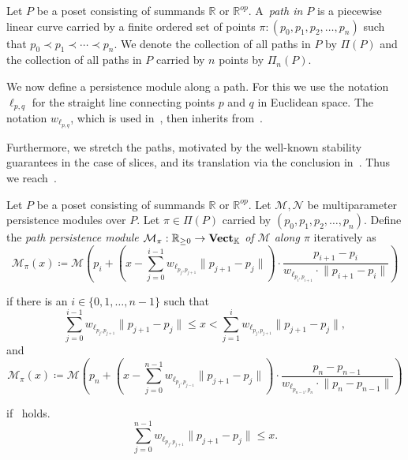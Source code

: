 \documentclass[sigconf, nonacm, natbib=false]{acmart} %
\def\M {{\mathcal{M}}}
\def\N {{\mathcal{N}}}
\def\X {{\mathcal{X}}}
\def\Y {{\mathcal{Y}}}
\def\RR{{\mathbb{R}}}
\def\path{\pi}
\def\pathset{\Pi}
\theoremstyle{plain}
\begin{document}
\begin{definition}\label{def:path}
Let $P$ be a poset consisting of summands $\RR$ or $\RR^{op}$. A~\emph{path in $P$} is a piecewise linear curve carried by a finite ordered set of points $\pi:(p_0, p_1, p_2 , \ldots ,p_n)$ such that $p_0\prec p_1 \prec \cdots \prec p_n$.
We denote the collection of all paths in $P$ by $\pathset(P)$
and the collection of all paths in $P$ carried by $n$ points by $\pathset_n(P)$.
\end{definition}

We now define a persistence module along a path. For this we use the notation 
$\ell_{p,q}$ for the straight line connecting points $p$ and $q$ in Euclidean space. The notation $w_{\ell_{p,q}}$, which is used in~, then inherits from~.

Furthermore, we stretch the paths, motivated by the well-known stability guarantees in the case of slices, and its translation via the conclusion in~. Thus we reach~.
\begin{definition}[Path persistence module $\M_\path$]\label{def:path_persistence_module}
Let $P$ be a poset consisting of summands $\RR$ or $\RR^{op}$. 
Let %
$\M,\N$ %
be multiparameter persistence modules over $P$. 
Let $\path\in\pathset(P)$ carried by $(p_0, p_1, p_2 , \ldots ,p_n)$. 
Define the \emph{path persistence module $\M_\path:\RR_{\geq0}\rightarrow \bf{Vect}_{\mathbb{K}}$ of $\M$ along $\path$} iteratively as 
{\scriptsize
\begin{equation}
  \M_\path (x) \coloneqq \M(p_i+(x-\sum_{j=0}^{i-1} w_{\ell_{p_j,p_{j+1}}} \lVert p_{j+1}-p_j \rVert)\cdot  \frac{p_{i+1}-p_i}{w_{\ell_{p_i,p_{i+1}}}\cdot \lVert p_{i+1}-p_i \rVert})\label{eq:path_persistence_module}
\end{equation}}


if there is an $i\in\{0,1,\ldots,n-1\}$ such that 
{\scriptsize\begin{equation}
\sum_{j=0}^{i-1} w_{\ell_{p_j,p_{j+1}}} \lVert p_{j+1}-p_j \rVert
\leq x 
< \sum_{j=1}^{i} w_{\ell_{p_j,p_{j+1}}} \lVert p_{j+1}-p_j\rVert,
\end{equation}}
and
{\scriptsize
\begin{equation}
\M_\path (x) \coloneqq 
\M(p_n+(x-\sum_{j=0}^{n-1} w_{\ell_{p_j,p_{j-1}}} \lVert p_{j+1}-p_j \rVert)\cdot \frac{p_{n}-p_{n-1}}{w_{\ell_{p_{n-1},p_n}}\cdot \lVert p_{n}-p_{n-1} \rVert})
\end{equation}
}

if~ holds. 
\scriptsize{\begin{equation}
  \sum_{j=0}^{n-1} w_{\ell_{p_j,p_{j+1}}} \lVert p_{j+1}-p_j\rVert\leq x\label{eq:path_persistence_module_end}.
\end{equation}}
\end{definition}
\end{document}
